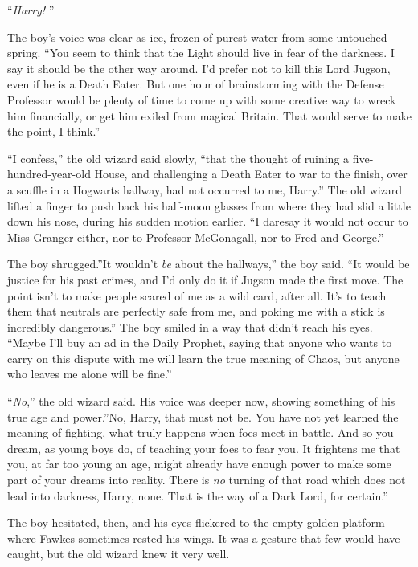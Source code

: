 ``\emph{Harry!} ''

The boy's voice was clear as ice, frozen of purest water from some
untouched spring. ``You seem to think that the Light should live in fear
of the darkness. I say it should be the other way around. I'd prefer not
to kill this Lord Jugson, even if he is a Death Eater. But one hour of
brainstorming with the Defense Professor would be plenty of time to come
up with some creative way to wreck him financially, or get him exiled
from magical Britain. That would serve to make the point, I think.''

``I confess,'' the old wizard said slowly, ``that the thought of ruining
a five-hundred-year-old House, and challenging a Death Eater to war to
the finish, over a scuffle in a Hogwarts hallway, had not occurred to
me, Harry.'' The old wizard lifted a finger to push back his half-moon
glasses from where they had slid a little down his nose, during his
sudden motion earlier. ``I daresay it would not occur to Miss Granger
either, nor to Professor McGonagall, nor to Fred and George.''

The boy shrugged.''It wouldn't \emph{be} about the hallways,'' the boy
said. ``It would be justice for his past crimes, and I'd only do it if
Jugson made the first move. The point isn't to make people scared of me
as a wild card, after all. It's to teach them that neutrals are
perfectly safe from me, and poking me with a stick is incredibly
dangerous.'' The boy smiled in a way that didn't reach his eyes. ``Maybe
I'll buy an ad in the Daily Prophet, saying that anyone who wants to
carry on this dispute with me will learn the true meaning of Chaos, but
anyone who leaves me alone will be fine.''

``\emph{No},'' the old wizard said. His voice was deeper now, showing
something of his true age and power.''No, Harry, that must not be. You
have not yet learned the meaning of fighting, what truly happens when
foes meet in battle. And so you dream, as young boys do, of teaching
your foes to fear you. It frightens me that you, at far too young an
age, might already have enough power to make some part of your dreams
into reality. There is \emph{no} turning of that road which does not
lead into darkness, Harry, none. That is the way of a Dark Lord, for
certain.''

The boy hesitated, then, and his eyes flickered to the empty golden
platform where Fawkes sometimes rested his wings. It was a gesture that
few would have caught, but the old wizard knew it very well.

